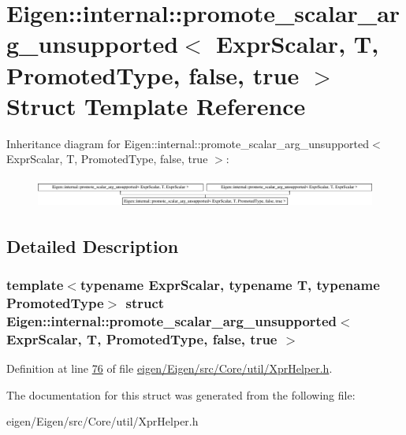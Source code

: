 \hypertarget{struct_eigen_1_1internal_1_1promote__scalar__arg__unsupported_3_01_expr_scalar_00_01_t_00_01_prob0c1a954168835d1f7a6330930c12504}{}\section{Eigen\+:\+:internal\+:\+:promote\+\_\+scalar\+\_\+arg\+\_\+unsupported$<$ Expr\+Scalar, T, Promoted\+Type, false, true $>$ Struct Template Reference}
\label{struct_eigen_1_1internal_1_1promote__scalar__arg__unsupported_3_01_expr_scalar_00_01_t_00_01_prob0c1a954168835d1f7a6330930c12504}
Inheritance diagram for Eigen\+:\+:internal\+:\+:promote\+\_\+scalar\+\_\+arg\+\_\+unsupported$<$ Expr\+Scalar, T, Promoted\+Type, false, true $>$\+:\begin{figure}[H]
\begin{center}
\leavevmode
\includegraphics[height=1.007194cm]{struct_eigen_1_1internal_1_1promote__scalar__arg__unsupported_3_01_expr_scalar_00_01_t_00_01_prob0c1a954168835d1f7a6330930c12504}
\end{center}
\end{figure}


\subsection{Detailed Description}
\subsubsection*{template$<$typename Expr\+Scalar, typename T, typename Promoted\+Type$>$\newline
struct Eigen\+::internal\+::promote\+\_\+scalar\+\_\+arg\+\_\+unsupported$<$ Expr\+Scalar, T, Promoted\+Type, false, true $>$}



Definition at line \hyperlink{eigen_2_eigen_2src_2_core_2util_2_xpr_helper_8h_source_l00076}{76} of file \hyperlink{eigen_2_eigen_2src_2_core_2util_2_xpr_helper_8h_source}{eigen/\+Eigen/src/\+Core/util/\+Xpr\+Helper.\+h}.



The documentation for this struct was generated from the following file\+:\begin{DoxyCompactItemize}
\item 
eigen/\+Eigen/src/\+Core/util/\+Xpr\+Helper.\+h\end{DoxyCompactItemize}
